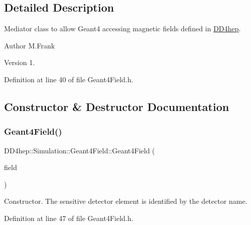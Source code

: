 \subsection{Detailed Description}
Mediator class to allow Geant4 accessing magnetic fields defined in \hyperlink{namespace_d_d4hep}{D\+D4hep}. 

\begin{DoxyAuthor}{Author}
M.\+Frank 
\end{DoxyAuthor}
\begin{DoxyVersion}{Version}
1. 
\end{DoxyVersion}


Definition at line 40 of file Geant4\+Field.\+h.



\subsection{Constructor \& Destructor Documentation}
\hypertarget{class_d_d4hep_1_1_simulation_1_1_geant4_field_addb058e48762664448c2c1fdce1cc807}{}\label{class_d_d4hep_1_1_simulation_1_1_geant4_field_addb058e48762664448c2c1fdce1cc807} 
\subsubsection{\texorpdfstring{Geant4\+Field()}{Geant4Field()}}
{\footnotesize\ttfamily D\+D4hep\+::\+Simulation\+::\+Geant4\+Field\+::\+Geant4\+Field (\begin{DoxyParamCaption}\item[{\hyperlink{class_d_d4hep_1_1_geometry_1_1_overlayed_field}{Geometry\+::\+Overlayed\+Field}}]{field }\end{DoxyParamCaption})\hspace{0.3cm}{\ttfamily [inline]}}



Constructor. The sensitive detector element is identified by the detector name. 



Definition at line 47 of file Geant4\+Field.\+h.

\hypertarget{class_d_d4hep_1_1_simulation_1_1_geant4_field_ac653a1246053747ac97c18dee3c8d9c2}{}\label{class_d_d4hep_1_1_simulation_1_1_geant4_field_ac653a1246053747ac97c18dee3c8d9c2} 
